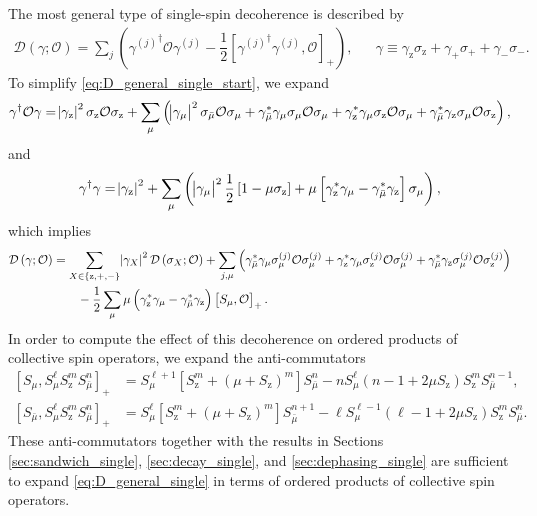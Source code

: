 \documentclass[aps,notitlepage,nofootinbib,11pt]{revtex4-1}
\newcommand{\f}[2]{\dfrac{#1}{#2}} %
\newcommand{\p}[1]{\left(#1\right)} %
\renewcommand{\sp}[1]{\left[#1\right]} %
\renewcommand{\set}[1]{\left\{#1\right\}} %
\newcommand{\D}{\mathcal{D}}
\renewcommand{\O}{\mathcal{O}}
\newcommand{\z}{\text{z}}
\newcommand{\bmu}{{\bar\mu}}
\newcommand{\1}{\mathds{1}}
\begin{document}
The most general type of single-spin decoherence is described by
\begin{align}
  \D\p{\gamma;\O}
  = \sum_j\p{{\gamma^{(j)}}^\dag \O \gamma^{(j)}
    - \f12\sp{{\gamma^{(j)}}^\dag \gamma^{(j)}, \O}_+},
  &&
  \gamma \equiv \gamma_\z \sigma_\z
  + \gamma_+ \sigma_+ + \gamma_- \sigma_-.
  \label{eq:D_general_single_start}
\end{align}
To simplify \eqref{eq:D_general_single_start}, we expand
\begin{align}
  \gamma^\dag \O \gamma
  = \abs{\gamma_\z}^2 \sigma_\z \O \sigma_\z
  + \sum_\mu \p{\abs{\gamma_\mu}^2 \sigma_\bmu \O \sigma_\mu
    + \gamma_\bmu^* \gamma_\mu \sigma_\mu \O \sigma_\mu
    + \gamma_\z^* \gamma_\mu \sigma_\z \O \sigma_\mu
    + \gamma_\bmu^* \gamma_\z \sigma_\mu \O \sigma_\z},
\end{align}
and
\begin{align}
  \gamma^\dag \gamma
  = \abs{\gamma_\z}^2
  + \sum_\mu \p{\abs{\gamma_\mu}^2 \f12 \sp{1-\mu\sigma_\z}
    + \mu \sp{\gamma_\z^*\gamma_\mu - \gamma_\bmu^*\gamma_\z}
    \sigma_\mu},
\end{align}
which implies
\begin{align}
  \D\p{\gamma;\O}
  &= \sum_{X\in\set{\z,+,-}} \abs{\gamma_X}^2 \D\p{\sigma_X;\O}
  + \sum_{j,\mu}
  \p{\gamma_\bmu^* \gamma_\mu \sigma_\mu^{(j)} \O \sigma_\mu^{(j)}
    + \gamma_\z^* \gamma_\mu \sigma_\z^{(j)} \O \sigma_\mu^{(j)}
    + \gamma_\bmu^* \gamma_\z \sigma_\mu^{(j)} \O \sigma_\z^{(j)}}
  \notag \\
  &\qquad -\f12 \sum_\mu \mu
  \p{\gamma_\z^*\gamma_\mu - \gamma_\bmu^*\gamma_\z} \sp{S_\mu, \O}_+.
  \label{eq:D_general_single}
\end{align}
In order to compute the effect of this decoherence on ordered products
of collective spin operators, we expand the anti-commutators
\begin{align}
  \sp{S_\mu, S_\mu^\ell S_\z^m S_\bmu^n}_+
  &= S_\mu^{\ell+1} \sp{S_\z^m+\p{\mu+S_\z}^m} S_\bmu^n
  - n S_\mu^\ell \p{n-1+2\mu S_\z} S_\z^m S_\bmu^{n-1}, \\
  \sp{S_\bmu, S_\mu^\ell S_\z^m S_\bmu^n}_+
  &= S_\mu^\ell \sp{S_\z^m+\p{\mu+S_\z}^m} S_\bmu^{n+1}
  - \ell S_\mu^{\ell-1} \p{\ell-1+2\mu S_\z} S_\z^m S_\bmu^n.
  \label{eq:S_mu_acomm}
\end{align}
These anti-commutators together with the results in Sections
\ref{sec:sandwich_single}, \ref{sec:decay_single}, and
\ref{sec:dephasing_single} are sufficient to expand
\eqref{eq:D_general_single} in terms of ordered products of collective
spin operators.
\end{document}
